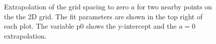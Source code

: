 \documentclass[singlepage,notitlepage,nofootinbib,11pt]{revtex4-1}
\begin{document}
\begin{figure}[h]
  \centering
  \captionsetup[subfigure]{labelformat=empty}
  \caption{\label{extrapolation} Extrapolation of the grid spacing to zero $a$ for two nearby points on the the 2D grid. The fit parameters are shown in the top right of each plot. The variable p0 shows the y-intercept and the $a=0$ extrapolation.}
\end{figure}
\end{document}
